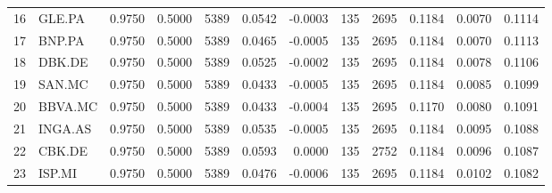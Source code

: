 \begin{table}
\begin{tabular}{llrrrrrrrrrr}
16 & GLE.PA & 0.9750 & 0.5000 & 5389 & 0.0542 & -0.0003 & 135 & 2695 & 0.1184 & 0.0070 & 0.1114 \\
17 & BNP.PA & 0.9750 & 0.5000 & 5389 & 0.0465 & -0.0005 & 135 & 2695 & 0.1184 & 0.0070 & 0.1113 \\
18 & DBK.DE & 0.9750 & 0.5000 & 5389 & 0.0525 & -0.0002 & 135 & 2695 & 0.1184 & 0.0078 & 0.1106 \\
19 & SAN.MC & 0.9750 & 0.5000 & 5389 & 0.0433 & -0.0005 & 135 & 2695 & 0.1184 & 0.0085 & 0.1099 \\
20 & BBVA.MC & 0.9750 & 0.5000 & 5389 & 0.0433 & -0.0004 & 135 & 2695 & 0.1170 & 0.0080 & 0.1091 \\
21 & INGA.AS & 0.9750 & 0.5000 & 5389 & 0.0535 & -0.0005 & 135 & 2695 & 0.1184 & 0.0095 & 0.1088 \\
22 & CBK.DE & 0.9750 & 0.5000 & 5389 & 0.0593 & 0.0000 & 135 & 2752 & 0.1184 & 0.0096 & 0.1087 \\
23 & ISP.MI & 0.9750 & 0.5000 & 5389 & 0.0476 & -0.0006 & 135 & 2695 & 0.1184 & 0.0102 & 0.1082 \\
\bottomrule
\end{tabular}
\end{table}
